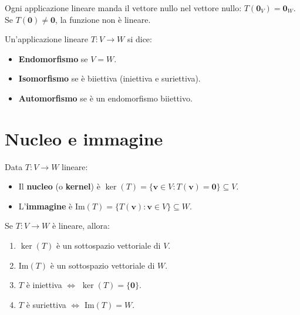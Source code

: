 \begin{notebox}
Ogni applicazione lineare manda il vettore nullo nel vettore nullo: $T(\mathbf{0}_V) = \mathbf{0}_W$. Se $T(\mathbf{0}) \neq \mathbf{0}$, la funzione non è lineare.
\end{notebox}

\begin{definitionbox}[Terminologia]
Un'applicazione lineare $T \colon V \to W$ si dice:
\begin{itemize}
    \item \textbf{Endomorfismo} se $V = W$.
    \item \textbf{Isomorfismo} se è biiettiva (iniettiva e suriettiva).
    \item \textbf{Automorfismo} se è un endomorfismo biiettivo.
\end{itemize}
\end{definitionbox}

\section{Nucleo e immagine}
\label{sec:nucleo-immagine}

\begin{definitionbox}
Data $T \colon V \to W$ lineare:
\begin{itemize}
    \item Il \textbf{nucleo} (o \textbf{kernel}) è $\ker(T) = \{\mathbf{v} \in V : T(\mathbf{v}) = \mathbf{0}\} \subseteq V$.
    \item L'\textbf{immagine} è $\text{Im}(T) = \{T(\mathbf{v}) : \mathbf{v} \in V\} \subseteq W$.
\end{itemize}
\end{definitionbox}

\begin{theorembox}
Se $T \colon V \to W$ è lineare, allora:
\begin{enumerate}
    \item $\ker(T)$ è un sottospazio vettoriale di $V$.
    \item $\text{Im}(T)$ è un sottospazio vettoriale di $W$.
    \item $T$ è iniettiva $\Leftrightarrow$ $\ker(T) = \{\mathbf{0}\}$.
    \item $T$ è suriettiva $\Leftrightarrow$ $\text{Im}(T) = W$.
\end{enumerate}
\end{theorembox}

